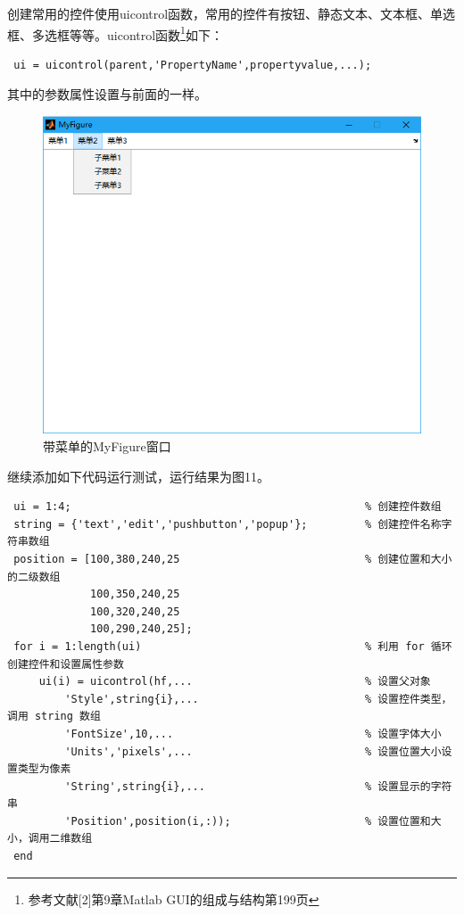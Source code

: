 \begin{enumerate}
	\qquad 创建常用的控件使用uicontrol函数，常用的控件有按钮、静态文本、文本框、单选框、多选框等等。uicontrol函数\footnote{参考文献[2]第9章Matlab GUI的组成与结构第199页}如下：
	\begin{lstlisting}
 ui = uicontrol(parent,'PropertyName',propertyvalue,...);\end{lstlisting}
 	其中的参数属性设置与前面的一样。
	\begin{figure}[H]
		\centering
		\includegraphics[scale=0.35]{MyFigure_uimenu}
		\caption{带菜单的MyFigure窗口}
	\end{figure}
	继续添加如下代码运行测试，运行结果为图11。
	\begin{lstlisting}
 ui = 1:4;												% 创建控件数组
 string = {'text','edit','pushbutton','popup'};			% 创建控件名称字符串数组
 position = [100,380,240,25								% 创建位置和大小的二级数组
             100,350,240,25
 			 100,320,240,25
             100,290,240,25];
 for i = 1:length(ui)									% 利用 for 循环创建控件和设置属性参数
     ui(i) = uicontrol(hf,...							% 设置父对象
         'Style',string{i},...							% 设置控件类型，调用 string 数组
         'FontSize',10,...								% 设置字体大小
         'Units','pixels',...							% 设置位置大小设置类型为像素
         'String',string{i},...							% 设置显示的字符串
         'Position',position(i,:));						% 设置位置和大小，调用二维数组
 end\end{lstlisting}
 	\begin{figure}[H]
		\centering

\end{figure}
\end{enumerate}
